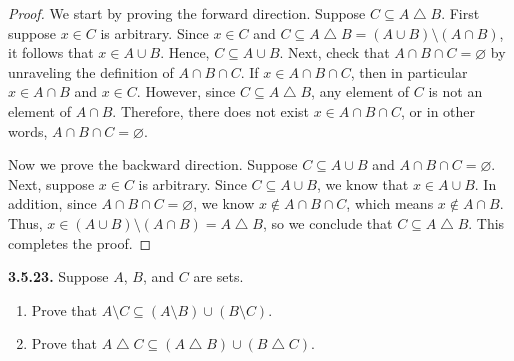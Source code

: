 \documentclass[12pt]{amsart}
\newenvironment{statement}[1]{\smallskip\noindent\color[rgb]{.6627, .3529, .6314} {\bf #1.}}{}
\theoremstyle{definition}
\theoremstyle{remark}
\begin{document}
\begin{proof}
We start by proving the forward direction.
Suppose $C \subseteq A \bigtriangleup B$.
First suppose $x \in C$ is arbitrary.
Since $x \in C$ and $C \subseteq A \bigtriangleup B = (A \cup B) \setminus (A \cap B)$, it follows that $x \in A \cup B$.
Hence, $C \subseteq A \cup B$.
Next, check that $A \cap B \cap C = \varnothing$ by unraveling the definition of $A \cap B \cap C$.
If $x \in A \cap B \cap C$, then in particular $x \in A \cap B$ and $x \in C$.
However, since $C \subseteq A \bigtriangleup B$, any element of $C$ is not an element of $A \cap B$.
Therefore, there does not exist $x \in A \cap B \cap C$, or in other words, $A \cap B \cap C = \varnothing$.

Now we prove the backward direction.
Suppose $C \subseteq A \cup B$ and $A \cap B \cap C = \varnothing$.
Next, suppose $x \in C$ is arbitrary.
Since $C \subseteq A \cup B$, we know that $x \in A \cup B$.
In addition, since $A \cap B \cap C = \varnothing$, we know $x \notin A \cap B \cap C$, which means $x \notin A \cap B$.
Thus, $x \in (A \cup B) \setminus (A \cap B) = A \bigtriangleup B$, so we conclude that $C \subseteq A \bigtriangleup B$.
This completes the proof.
\end{proof}


\begin{statement}{3.5.23}
Suppose $A$, $B$, and $C$ are sets.
\begin{enumerate}
	\item Prove that $A \setminus C \subseteq (A \setminus B) \cup (B \setminus C)$.
	
	\item Prove that $A \bigtriangleup C \subseteq (A \bigtriangleup B) \cup (B \bigtriangleup C)$.
\end{enumerate}
\end{statement}
\end{document}
